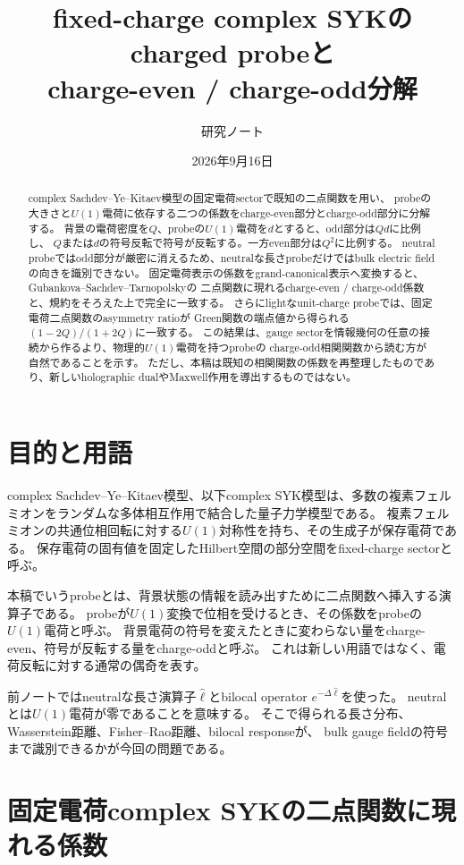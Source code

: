 \documentclass[a4paper,11pt]{ltjsarticle}
\title{fixed-charge complex SYKのcharged probeと\\charge-even / charge-odd分解}
\author{研究ノート}
\date{2026年9月16日}
\numberwithin{equation}{section}
\begin{document}
\maketitle
\begin{abstract}
complex Sachdev--Ye--Kitaev模型の固定電荷sectorで既知の二点関数を用い、
probeの大きさと$U(1)$電荷に依存する二つの係数をcharge-even部分とcharge-odd部分に分解する。
背景の電荷密度を$Q$、probeの$U(1)$電荷を$d$とすると、odd部分は$Qd$に比例し、
$Q$または$d$の符号反転で符号が反転する。一方even部分は$Q^2$に比例する。
neutral probeではodd部分が厳密に消えるため、neutralな長さprobeだけではbulk electric fieldの向きを識別できない。
固定電荷表示の係数をgrand-canonical表示へ変換すると、Gubankova--Sachdev--Tarnopolskyの
二点関数に現れるcharge-even / charge-odd係数と、規約をそろえた上で完全に一致する。
さらにlightなunit-charge probeでは、固定電荷二点関数のasymmetry ratioが
Green関数の端点値から得られる$(1-2Q)/(1+2Q)$に一致する。
この結果は、gauge sectorを情報幾何の任意の接続から作るより、物理的$U(1)$電荷を持つprobeの
charge-odd相関関数から読む方が自然であることを示す。
ただし、本稿は既知の相関関数の係数を再整理したものであり、新しいholographic dualやMaxwell作用を導出するものではない。
\end{abstract}
\tableofcontents
\clearpage

\section{目的と用語}
complex Sachdev--Ye--Kitaev模型、以下complex SYK模型は、多数の複素フェルミオンをランダムな多体相互作用で結合した量子力学模型である。
複素フェルミオンの共通位相回転に対する$U(1)$対称性を持ち、その生成子が保存電荷である。
保存電荷の固有値を固定したHilbert空間の部分空間をfixed-charge sectorと呼ぶ。

本稿でいうprobeとは、背景状態の情報を読み出すために二点関数へ挿入する演算子である。
probeが$U(1)$変換で位相を受けるとき、その係数をprobeの$U(1)$電荷と呼ぶ。
背景電荷の符号を変えたときに変わらない量をcharge-even、符号が反転する量をcharge-oddと呼ぶ。
これは新しい用語ではなく、電荷反転に対する通常の偶奇を表す。

前ノートではneutralな長さ演算子$\hat\ell$とbilocal operator $e^{-\Delta\hat\ell}$を使った。
neutralとは$U(1)$電荷が零であることを意味する。
そこで得られる長さ分布、Wasserstein距離、Fisher--Rao距離、bilocal responseが、
bulk gauge fieldの符号まで識別できるかが今回の問題である。

\section{固定電荷complex SYKの二点関数に現れる係数}
\end{document}
